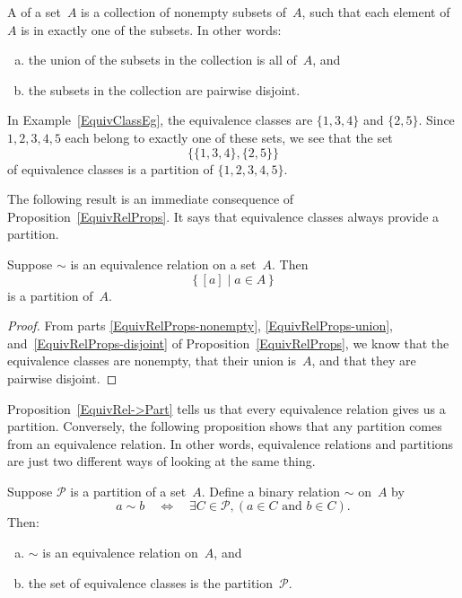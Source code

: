 \begin{defn}
A  of a set~$A$ is a collection of nonempty subsets of~$A$, such that each element of~$A$ is in exactly one of the subsets. In other words:
\begin{enumerate}[(a)]
\item the union of the subsets in the collection is all of~$A$,
and
\item the subsets in the collection are pairwise disjoint.
\end{enumerate}
\end{defn}


\begin{eg} \label{EquivClassPartEg}
In Example~\ref{EquivClassEg}, the equivalence classes are $\{1,3,4\}$ and $\{2,5\}$. Since $1,2,3,4,5$ each belong to exactly one of these sets, we see that the set
	$$ \bigl\{ \{1,3,4\}, \{2,5\} \bigr\} $$
of equivalence classes is a partition of $\{1,2, 3,4,5\}$.
\end{eg}


The following result is an immediate consequence of Proposition~\ref{EquivRelProps}. It says that equivalence classes always provide a partition.

\begin{thm} \label{EquivRel->Part}
Suppose $\sim$ is an equivalence relation on a set~$A$. Then 
	$$ \{\, [a] \mid a \in A \,\} $$
is a partition of~$A$.
\end{thm}

\begin{proof}
From parts \ref{EquivRelProps-nonempty}, \ref{EquivRelProps-union}, and~\ref{EquivRelProps-disjoint} of Proposition~\ref{EquivRelProps}, we know that the equivalence classes are nonempty, that their union is~$A$, and that they are pairwise disjoint.
\end{proof}

Proposition~\ref{EquivRel->Part} tells us that every equivalence relation gives us a partition. Conversely, the following proposition shows that any partition comes from an equivalence relation. In other words, equivalence relations and partitions are just two different ways of looking at the same thing.

\begin{prop}{}\label{Part->EquivRel}
Suppose $\mathcal{P}$ is a partition of a set~$A$. Define a binary relation $\sim$ on~$A$ by
\[ a \sim b \quad \iff \quad \exists C \in \mathcal{P}, ( a \in C \text{ and } b \in C ) .\]
Then:
\begin{enumerate}[(a)]
\item \label{Part->EquivRel-equiv}
 $\sim$ is an equivalence relation on~$A$,
and
\item \label{Part->EquivRel-classes}
 the set of equivalence classes is the partition~$\mathcal{P}$.
\end{enumerate}
\end{prop}



